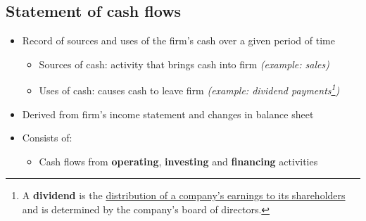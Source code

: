 \documentclass[ieeetran]{article}
\begin{document}
\subsection{Statement of cash flows} %
\label{sub:statement_of_cash_flows}
\begin{itemize}
  \item Record of sources and uses of the firm's cash over a given period of time
	  \begin{itemize}
	    \item Sources of cash: activity that brings cash into firm \textit{(example: sales)}
	    \item Uses of cash: causes cash to leave firm \textit{(example: dividend payments\footnote{A \textbf{dividend} is the \underline{distribution of a company's earnings to its shareholders} and is determined by the company's board of directors.})}
	  \end{itemize}
	    \item Derived from firm's income statement and changes in balance sheet
	    \item Consists of:
		    \begin{itemize}
		      \item Cash flows from \textbf{operating}, \textbf{investing} and \textbf{financing} activities
		    \end{itemize}
\end{itemize}

\pagebreak
 
\end{document}
